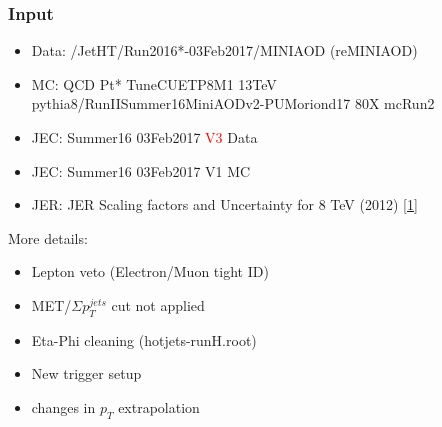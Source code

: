 \documentclass[t,compress]{beamer}
\begin{document}
\begin{frame}
  \frametitle{Input}
  \vspace{-0.5cm}
  \begin{itemize}
   \item Data: /JetHT/Run2016*-03Feb2017/MINIAOD (reMINIAOD) 
   \item  MC: QCD Pt* TuneCUETP8M1 13TeV pythia8/RunIISummer16MiniAODv2-PUMoriond17 80X mcRun2 \newline
  \item JEC: Summer16 03Feb2017 \textcolor{red}{V3} Data
  \item JEC: Summer16 03Feb2017 V1 MC
  \item JER: JER Scaling factors and Uncertainty for 8 TeV (2012) \href{https://twiki.cern.ch/twiki/bin/viewauth/CMS/JetResolution}{[1]}
  \end{itemize}

More details:
\begin{itemize}
\item Lepton veto (Electron/Muon tight ID)
\item MET/$\Sigma p_T^{jets}$ cut not applied 
\item Eta-Phi cleaning (hotjets-runH.root)
\item New trigger setup 
\item changes in $p_T$ extrapolation
 \end{itemize}
 \end{frame}
 
\end{document}
